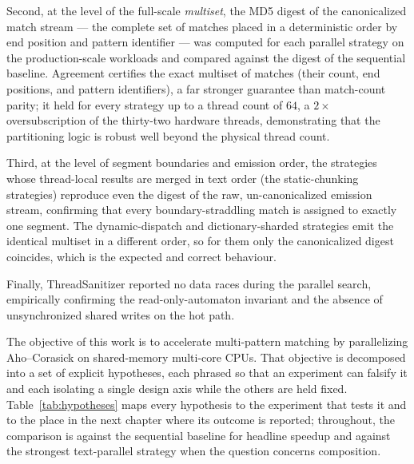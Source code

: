 Second, at the level of the full-scale \emph{multiset}, the MD5 digest of the
canonicalized match stream --- the complete set of matches placed in a
deterministic order by end position and pattern identifier --- was computed for
each parallel strategy on the production-scale workloads and compared against the
digest of the sequential baseline. Agreement certifies the exact multiset of
matches (their count, end positions, and pattern identifiers), a far stronger
guarantee than match-count parity; it held for every strategy up to a thread
count of $64$, a $2\times$ oversubscription of the thirty-two hardware threads,
demonstrating that the partitioning logic is robust well beyond the physical
thread count.

Third, at the level of segment boundaries and emission order, the strategies
whose thread-local results are merged in text order (the static-chunking
strategies) reproduce even the digest of the raw, un-canonicalized emission
stream, confirming that every boundary-straddling match is assigned to exactly
one segment. The dynamic-dispatch and dictionary-sharded strategies emit the
identical multiset in a different order, so for them only the canonicalized digest
coincides, which is the expected and correct behaviour.

Finally, ThreadSanitizer reported no data races during the parallel search,
empirically confirming the read-only-automaton invariant and the absence of
unsynchronized shared writes on the hot path.


The objective of this work is to accelerate multi-pattern matching by
parallelizing Aho--Corasick on shared-memory multi-core CPUs. That objective is
decomposed into a set of explicit hypotheses, each phrased so that an experiment
can falsify it and each isolating a single design axis while the others are held
fixed. Table~\ref{tab:hypotheses} maps every hypothesis to the experiment that
tests it and to the place in the next chapter where its outcome is reported;
throughout, the comparison is against the sequential baseline for headline
speedup and against the strongest text-parallel strategy when the question
concerns composition.


